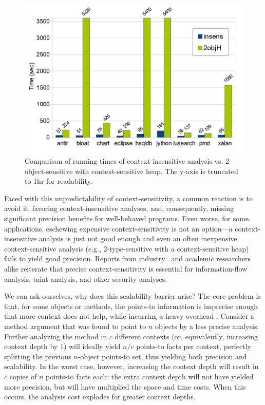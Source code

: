 \begin{figure}[hp]
\begin{center}
\hspace{-2mm}\includegraphics[scale=0.42]{assets/introspective/intro-chart.pdf}
\end{center}
\vspace{-0.6cm}
\caption{Comparison of running times of context-insensitive analysis vs. 2-object-sensitive with context-sensitive heap. The y-axis is truncated to 1hr for readability.}
\label{fig:introspect:intro}
\end{figure}

Faced with this unpredictability of context-sensitivity, a common reaction is to avoid it, favoring context-insensitive analyses, and, consequently, missing significant precision benefits for well-behaved programs. Even worse, for some applications, eschewing expensive context-sensitivity is not an option---a context-insensitive analysis is just not good enough and even an often inexpensive context-sensitive analysis (e.g., 2-type-sensitive with a context-sensitive heap) fails to yield good precision. Reports from industry~\cite{misc:Cifuentes} and academic researchers~\cite{misc:Chong} alike reiterate that precise context-sensitivity is essential for information-flow analysis, taint analysis, and other security analyses.

We can ask ourselves, why does this scalability barrier arise? The core problem is that, for some objects or methods, the points-to information is imprecise enough that more context does not help, while incurring a heavy overhead \cite{popl:2011:Smaragdakis}. Consider a method argument that was found to point to $n$ objects by a less precise analysis. Further analyzing the method in $c$ different contexts (or, equivalently, increasing context depth by 1) will ideally yield $n/c$ points-to facts per context, perfectly splitting the previous $n$-object points-to set, thus yielding both precision and scalability. In the worst case, however, increasing the context depth will result in $c$ copies of $n$ points-to facts each: the extra context depth will not have yielded more precision, but will have multiplied the space and time costs. When this occurs, the analysis cost explodes for greater context depths.

